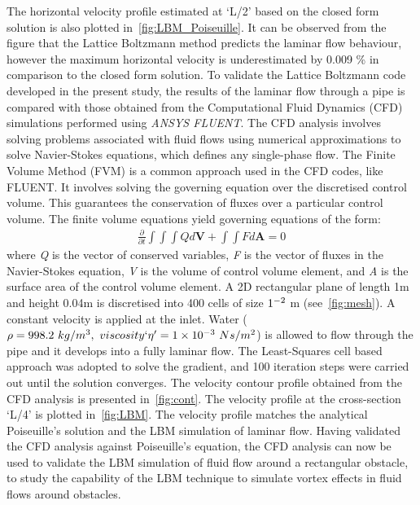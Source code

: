 The horizontal velocity profile estimated at `L/2' based on the closed form 
solution is also plotted in~\cref{fig:LBM_Poiseuille}. It can be observed from 
the figure that the Lattice Boltzmann method predicts the laminar flow 
behaviour, however the maximum horizontal velocity is underestimated by 0.009 
\% in comparison to the closed form solution. To validate the Lattice Boltzmann 
code developed in the present study, the results of the laminar flow through a 
pipe is compared with those obtained from the Computational Fluid Dynamics 
(CFD) simulations performed using \textit{ANSYS FLUENT}. The CFD analysis 
involves solving problems associated with fluid flows using numerical 
approximations to solve Navier-Stokes equations, which defines any single-phase 
flow. The Finite Volume Method (FVM) is a common approach used in the CFD 
codes, like FLUENT. It involves solving the governing equation over the 
discretised control volume. This guarantees the conservation of fluxes over a 
particular control volume. The finite volume equations yield governing 
equations of the form:
%
\begin{align}
\frac{\partial}{\partial t} \int\int\int  Q d\mathbf{V} + \int\int \mathit{F} d\mathbf{A} = 0
\end{align}
%
where \textit{Q} is the vector of conserved variables, \textit{F} is the vector 
of fluxes in the Navier-Stokes equation, \textit{V} is the volume of control 
volume element, and \textit{A} is the surface area of the control volume 
element. A 2D rectangular plane of length 1m and height 0.04m is discretised 
into 400 cells of size $1 \time 10^{-2} $ m (see~\cref{fig:mesh}). A constant 
velocity is applied at the inlet. Water ($\rho = 998.2\mbox{ }kg/m^{3},\mbox{ } 
viscosity`\eta'=1 \times 10^{-3}\mbox{ } Ns/m^{2} $) is allowed to flow through 
the pipe and it develops into a fully laminar flow. The Least-Squares cell 
based approach was adopted to solve the gradient, and 100 iteration steps were 
carried out until the solution converges. The velocity contour profile obtained 
from the CFD analysis is presented in~\cref{fig:cont}. The velocity profile at 
the cross-section `L/4' is plotted in~\cref{fig:LBM}. The velocity profile 
matches the analytical Poiseuille's solution and the LBM simulation of laminar 
flow. Having validated the CFD analysis against Poiseuille's equation, the CFD 
analysis can now be used to validate the LBM simulation of fluid flow around a 
rectangular obstacle, to study the capability of the LBM technique to simulate 
vortex effects in fluid flows around obstacles.

